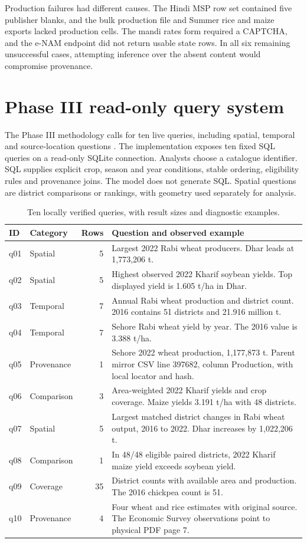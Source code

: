 \documentclass[11pt,a4paper]{article}
\begin{document}
Production failures had different causes. The Hindi MSP row set contained five publisher blanks, and the bulk production file and Summer rice and maize exports lacked production cells. The mandi rates form required a CAPTCHA, and the e-NAM endpoint did not return usable state rows. In all six remaining unsuccessful cases, attempting inference over the absent content would compromise provenance.

\clearpage
\section{Phase III read-only query system}
The Phase III methodology calls for ten live queries, including spatial, temporal and source-location questions \cite{method,phase3}. The implementation exposes ten fixed SQL queries on a read-only SQLite connection. Analysts choose a catalogue identifier. SQL supplies explicit crop, season and year conditions, stable ordering, eligibility rules and provenance joins. The model does not generate SQL. Spatial questions are district comparisons or rankings, with geometry used separately for analysis.

\begin{table}[!ht]
\small
\setlength{\tabcolsep}{4pt}
\caption{Ten locally verified queries, with result sizes and diagnostic examples.}
\label{tab:queries}
\begin{tabularx}{\linewidth}{@{}llrY@{}}
\toprule
ID & Category & Rows & Question and observed example\\ \midrule
q01 & Spatial & 5 & Largest 2022 Rabi wheat producers. Dhar leads at 1,773,206 t.\\
q02 & Spatial & 5 & Highest observed 2022 Kharif soybean yields. Top displayed yield is 1.605 t/ha in Dhar.\\
q03 & Temporal & 7 & Annual Rabi wheat production and district count. 2016 contains 51 districts and 21.916 million t.\\
q04 & Temporal & 7 & Sehore Rabi wheat yield by year. The 2016 value is 3.388 t/ha.\\
q05 & Provenance & 1 & Sehore 2022 wheat production, 1,177,873 t. Parent mirror CSV line 397682, column Production, with local locator and hash.\\
q06 & Comparison & 3 & Area-weighted 2022 Kharif yields and crop coverage. Maize yields 3.191 t/ha with 48 districts.\\
q07 & Spatial & 5 & Largest matched district changes in Rabi wheat output, 2016 to 2022. Dhar increases by 1,022,206 t.\\
q08 & Comparison & 1 & In 48/48 eligible paired districts, 2022 Kharif maize yield exceeds soybean yield.\\
q09 & Coverage & 35 & District counts with available area and production. The 2016 chickpea count is 51.\\
q10 & Provenance & 4 & Four wheat and rice estimates with original source. The Economic Survey observations point to physical PDF page 7.\\
\bottomrule
\end{tabularx}
\end{table}
\end{document}
